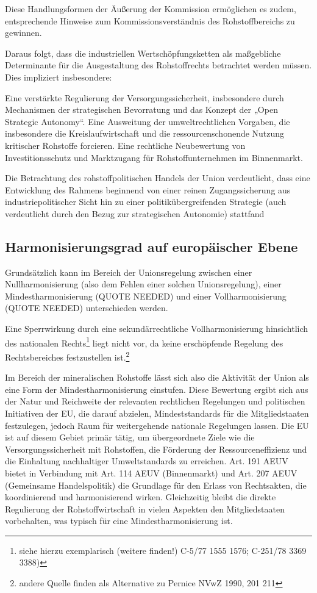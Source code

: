 \documentclass[12pt,a4paper,oneside]{book} %
\begin{document}
Diese Handlungsformen der Äußerung der Kommission ermöglichen es zudem, entsprechende Hinweise zum Kommissionsverständnis des Rohstoffbereichs zu gewinnen.

Daraus folgt, dass die industriellen Wertschöpfungsketten als maßgebliche Determinante für die Ausgestaltung des Rohstoffrechts betrachtet werden müssen. Dies impliziert insbesondere:

Eine verstärkte Regulierung der Versorgungssicherheit, insbesondere durch Mechanismen der strategischen Bevorratung und das Konzept der „Open Strategic Autonomy“.
Eine Ausweitung der umweltrechtlichen Vorgaben, die insbesondere die Kreislaufwirtschaft und die ressourcenschonende Nutzung kritischer Rohstoffe forcieren.
Eine rechtliche Neubewertung von Investitionsschutz und Marktzugang für Rohstoffunternehmen im Binnenmarkt.

Die Betrachtung des rohstoffpolitischen Handels der Union verdeutlicht, dass eine Entwicklung des Rahmens beginnend von einer reinen Zugangssicherung aus industriepolitischer Sicht hin zu einer politikübergreifenden Strategie (auch verdeutlicht durch den Bezug zur \glqq strategischen Autonomie\grqq) stattfand
	
\subsection{Harmonisierungsgrad auf europäischer Ebene}
Grundsätzlich kann im Bereich der Unionsregelung zwischen einer Nullharmonisierung (also dem Fehlen einer solchen Unionsregelung), einer Mindestharmonisierung (QUOTE NEEDED) und einer Vollharmonisierung (QUOTE NEEDED) unterschieden werden. 
	
	
Eine Sperrwirkung durch eine sekundärrechtliche Vollharmonisierung hinsichtlich des nationalen Rechts\footnote{siehe hierzu exemplarisch (weitere finden!) C-5/77 1555 1576; C-251/78 3369 3388)} liegt nicht vor, da keine erschöpfende Regelung des Rechtsbereiches festzustellen ist.\footnote{andere Quelle finden als Alternative zu Pernice NVwZ 1990, 201 211}
	
Im Bereich der mineralischen Rohstoffe lässt sich also die Aktivität der Union als eine Form der Mindestharmonisierung einstufen.  Diese Bewertung ergibt sich aus der Natur und Reichweite der relevanten rechtlichen Regelungen und politischen Initiativen der EU, die darauf abzielen, Mindeststandards für die Mitgliedstaaten festzulegen, jedoch Raum für weitergehende nationale Regelungen lassen. Die EU ist auf diesem Gebiet primär tätig, um übergeordnete Ziele wie die Versorgungssicherheit mit Rohstoffen, die Förderung der Ressourceneffizienz und die Einhaltung nachhaltiger Umweltstandards zu erreichen. Art. 191 AEUV bietet in Verbindung mit Art. 114 AEUV (Binnenmarkt) und Art. 207 AEUV (Gemeinsame Handelspolitik) die Grundlage für den Erlass von Rechtsakten, die koordinierend und harmonisierend wirken. Gleichzeitig bleibt die direkte Regulierung der Rohstoffwirtschaft in vielen Aspekten den Mitgliedstaaten vorbehalten, was typisch für eine Mindestharmonisierung ist.
	
\end{document}
